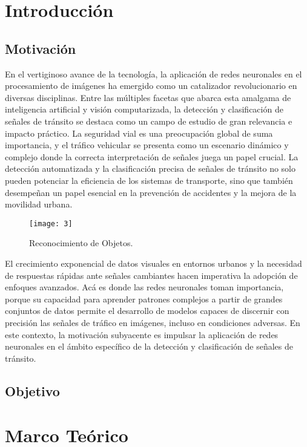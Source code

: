 \section{Introducción}
	\subsection{Motivación}
	En el vertiginoso avance de la tecnología, la aplicación de redes neuronales en el procesamiento de imágenes ha emergido como un catalizador revolucionario en diversas disciplinas. Entre las múltiples facetas que abarca esta amalgama de inteligencia artificial y visión computarizada, la detección y clasificación de señales de tránsito se destaca como un campo de estudio de gran relevancia e impacto práctico.
La seguridad vial es una preocupación global de suma importancia, y el tráfico vehicular se presenta como un escenario dinámico y complejo donde la correcta interpretación de señales juega un papel crucial. La detección automatizada y la clasificación precisa de señales de tránsito no solo pueden potenciar la eficiencia de los sistemas de transporte, sino que también desempeñan un papel esencial en la prevención de accidentes y la mejora de la movilidad urbana.
	\begin{figure}[ht]
		\centering
		\texttt{[image: 3]}
		\caption{Reconocimiento de Objetos.}
	\end{figure}
	
El crecimiento exponencial de datos visuales en entornos urbanos y la necesidad de respuestas rápidas ante señales cambiantes hacen imperativa la adopción de enfoques avanzados. Acá es donde las redes neuronales toman importancia, porque su capacidad para aprender patrones complejos a partir de grandes conjuntos de datos permite el desarrollo de modelos capaces de discernir con precisión las señales de tráfico en imágenes, incluso en condiciones adversas.
En este contexto, la motivación subyacente es impulsar la aplicación de redes neuronales en el ámbito específico de la detección y clasificación de señales de tránsito.

\subsection {Objetivo}
\clearpage

\section{Marco Teórico}
